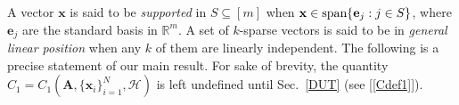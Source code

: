 \documentclass[9pt,twocolumn]{pnas-new}
\renewcommand{\eqref}[1]{\textnormal{[\ref{#1}]}}
\begin{document}
A vector $\mathbf{x}$ is said to be \emph{supported} in $S \subseteq [m]$ when $\mathbf{x} \in \text{\rm span}\{\mathbf{e}_j: j\in S\}$, where $\mathbf{e}_j$ are the standard basis in $\mathbb R^m$. 
A set of $k$-sparse vectors is said to be in \emph{general linear position} when any $k$ of them are linearly independent. The following is a precise statement of our main result.  For sake of brevity, the quantity $C_1 = C_1(\mathbf{A}, \{\mathbf{x}_i\}_{i=1}^N, \mathcal{H})$ is left undefined until Sec.~\ref{DUT} (see \eqref{Cdef1}).
% 
\end{document}
